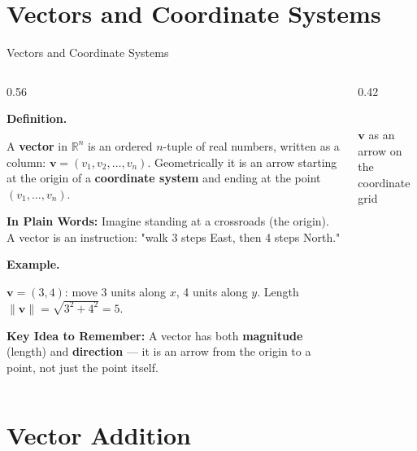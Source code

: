 \documentclass[9pt,aspectratio=169]{beamer}
\newcommand{\keyidea}[1]{%
\par\medskip\noindent\textbf{Key Idea to Remember:} #1\par\medskip}
\newcommand{\childex}[1]{%
\par\medskip\noindent\textbf{In Plain Words:} #1\par\medskip}
\begin{document}
\section{Vectors and Coordinate Systems}

\begin{frame}{Vectors and Coordinate Systems}
\footnotesize
\begin{columns}[T]
\begin{column}{0.56\textwidth}
\par\noindent\textbf{Definition.}\par
A \textbf{vector} in $\mathbb{R}^n$ is an ordered $n$-tuple of real numbers, written as a
column: $\mathbf{v} = (v_1, v_2, \dots, v_n)$. Geometrically it is an arrow starting at the
origin of a \textbf{coordinate system} and ending at the point $(v_1,\dots,v_n)$.
\medskip

\childex{Imagine standing at a crossroads (the origin). A vector is an instruction:
"walk 3 steps East, then 4 steps North."}

\par\noindent\textbf{Example.}\par
$\mathbf{v} = (3,4)$: move 3 units along $x$, 4 units along $y$.
Length $\|\mathbf{v}\| = \sqrt{3^2+4^2} = 5$.
\medskip

\keyidea{A vector has both \textbf{magnitude} (length) and \textbf{direction} --- it is an
arrow from the origin to a point, not just the point itself.}
\end{column}
\begin{column}{0.42\textwidth}
\centering
{}
\\[0.3em]{\scriptsize $\mathbf{v}$ as an arrow on the coordinate grid}
\end{column}
\end{columns}
\end{frame}

\section{Vector Addition}
\end{document}
